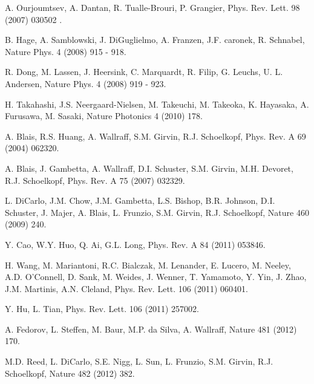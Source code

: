 \documentclass[preprintnumbers,showkeys,amsmath,amssymb]{revtex4}%
\begin{document}
\begin{thebibliography}{1}
 A. Ourjoumtsev, A. Dantan, R. Tualle-Brouri, P. Grangier, Phys. Rev. Lett. 98 (2007) 030502 .

 B. Hage, A. Samblowski, J. DiGuglielmo, A. Franzen, J.F. caronek, R. Schnabel, Nature Phys. 4 (2008) 915 - 918.

 R. Dong, M. Lassen, J. Heersink, C. Marquardt, R. Filip, G. Leuchs, U. L. Andersen, Nature Phys. 4 (2008) 919 - 923.

 H. Takahashi, J.S. Neergaard-Nielsen, M. Takeuchi, M. Takeoka, K. Hayasaka, A. Furusawa, M. Sasaki, Nature Photonics 4 (2010) 178.




 A. Blais, R.S. Huang, A. Wallraff, S.M. Girvin, R.J. Schoelkopf, Phys. Rev. A 69 (2004) 062320.


 A. Blais, J. Gambetta, A. Wallraff, D.I. Schuster, S.M. Girvin, M.H. Devoret, R.J. Schoelkopf, Phys. Rev. A 75 (2007) 032329.

 L. DiCarlo, J.M. Chow, J.M. Gambetta, L.S. Bishop, B.R. Johnson, D.I. Schuster, J. Majer, A. Blais, L. Frunzio, S.M. Girvin, R.J. Schoelkopf, Nature 460 (2009) 240.

 Y. Cao, W.Y. Huo, Q. Ai, G.L. Long, Phys. Rev. A 84 (2011) 053846.

 H. Wang, M. Mariantoni, R.C. Bialczak, M. Lenander, E. Lucero, M. Neeley, A.D. O'Connell, D. Sank, M. Weides, J. Wenner, T. Yamamoto, Y. Yin, J. Zhao, J.M. Martinis, A.N. Cleland, Phys. Rev. Lett. 106 (2011) 060401.

 Y. Hu, L. Tian, Phys. Rev. Lett. 106 (2011) 257002.

 A. Fedorov, L. Steffen, M. Baur, M.P. da Silva, A. Wallraff, Nature 481 (2012) 170.

 M.D. Reed, L. DiCarlo, S.E. Nigg, L. Sun, L. Frunzio, S.M. Girvin, R.J. Schoelkopf, Nature 482 (2012) 382.



\end{thebibliography}
\end{document}

